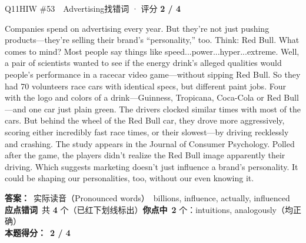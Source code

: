 \begin{qblock}{Q11\quad HIW \#53\ \ Advertising}{找错词 · 评分 \textcolor{cAccent}{\bfseries 2 / 4}}
\begin{promptbox}
Companies spend  on advertising every year. But they're not just pushing products---they're selling their brand's ``personality,'' too. Think: Red Bull. What comes to mind? Most people say things like speed...power...hyper...extreme. Well, a pair of scientists wanted to see if the energy drink's alleged qualities would  people's performance in a racecar video game---without sipping Red Bull. So they had 70 volunteers race cars with identical specs, but different paint jobs. Four with the logo and colors of a drink---Guinness, Tropicana, Coca-Cola or Red Bull---and one car just plain green. The drivers clocked similar times with most of the cars. But behind the wheel of the Red Bull car, they  drove more aggressively, scoring either incredibly fast race times, or their slowest---by driving recklessly and crashing. The study appears in the Journal of Consumer Psychology. Polled after the game, the players didn't realize the Red Bull image apparently  their driving. Which suggests marketing doesn't just influence a brand's personality. It could be shaping our personalities, too, without our even knowing it.
\end{promptbox}
\par\smallskip
\textbf{答案：}\ 实际读音（Pronounced words）\ {\color{cFix}billions, influence, actually, influenced}\\
\textbf{应点错词}\ 共 \textbf{4} 个（已红下划线标出）\qquad\textbf{你点中}\ \textbf{2} 个：intuitions, analogously（均正确）\\[2pt]\textbf{本题得分：}\ {\color{cAccent}\bfseries 2 / 4}
\end{qblock}

